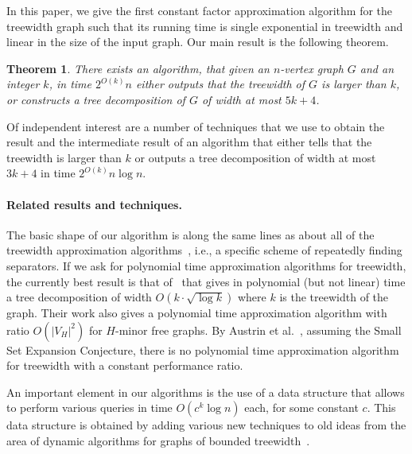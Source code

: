 \documentclass[a4paper,11pt]{article}
\newtheorem{theorem}{Theorem}
\theoremstyle{definition}
\theoremstyle{remark}
\begin{document}
In this paper, we give the first constant factor approximation
algorithm for the treewidth graph such that its running time is single
exponential in treewidth and linear in the size of the input
graph. Our main result is the following theorem.


\begin{theorem}\label{thm:mainThm}
  There exists an algorithm, that given an $n$-vertex graph $G$ and
  an integer $k$, in time $2^{O(k)} n$ either outputs that the treewidth
  of $G$ is larger than $k$, or constructs a tree decomposition of $G$
  of width at most $5k + 4$.
\end{theorem}

Of independent interest are a number of techniques that we use to
obtain the result and the intermediate result of an algorithm that
either tells that the treewidth is larger than $k$ or outputs a tree
decomposition of width at most $3k+4$ in time $2^{O(k)} n \log n$.



\paragraph{Related results and techniques.}
The basic shape of our algorithm is along the same lines as about all
of the treewidth approximation algorithms~\cite{Amir10,
  BodlaenderGHK95, FeigeHL08, Lagergren96, Reed92, RobertsonS13},
i.e., a specific scheme of repeatedly finding separators.  If we ask
for polynomial time approximation algorithms for treewidth, the
currently best result is that of~\cite{FeigeHL08} that gives in
polynomial (but not linear) time a tree decomposition of width $O(k
\cdot \sqrt{\log k})$ where $k$ is the treewidth of the graph.  Their
work also gives a polynomial time approximation algorithm with ratio
$O(|V_H|^2)$ for $H$-minor free graphs.
By Austrin et al.~\cite{AustrinPW12}, assuming the Small Set Expansion
Conjecture, there is no polynomial time approximation algorithm for
treewidth with a constant performance ratio.

An important element in our algorithms is the use of a data structure
that allows to perform various queries in time $O(c^k \log n)$ each,
for some constant $c$.  This data structure is obtained by adding
various new techniques to old ideas from the area of dynamic
algorithms for graphs of bounded treewidth~\cite{Bodlaender92b,
  CohenSTV93, ChaudhuriZ98, ChaudhuriZ00, Hagerup00}.
\end{document}
